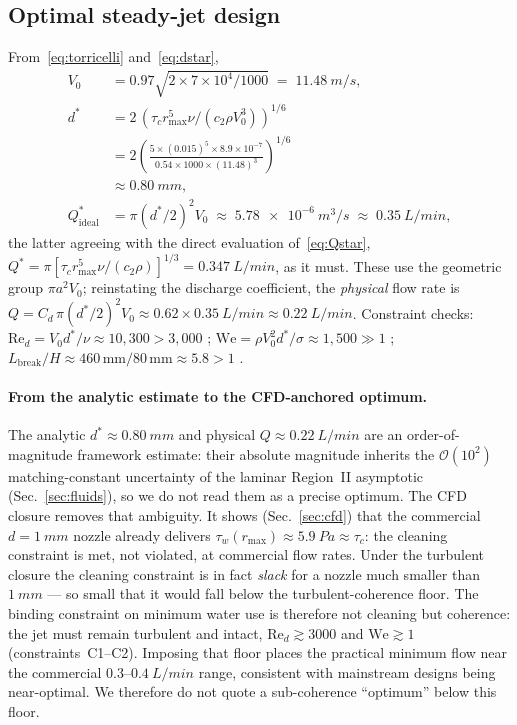 \documentclass[aps,prfluids,reprint,amsmath,amssymb,floatfix]{revtex4-2}
\newcommand{\Rey}{\mathrm{Re}}
\newcommand{\We}{\mathrm{We}}
\newcommand{\order}[1]{\mathcal{O}\!\left(#1\right)}
\begin{document}
\subsection{Optimal steady-jet design}

From~\eqref{eq:torricelli} and~\eqref{eq:dstar},
\begin{align}
  V_0 &= 0.97\sqrt{2 \times 7\times 10^4/1000} \;=\; \SI{11.48}{m/s},\\
  d^* &= 2\,(\tau_c r_\mathrm{max}^5 \nu/(c_2\rho V_0^3))^{1/6}\nonumber\\
      &= 2\left(\frac{5 \times (0.015)^5 \times 8.9\times 10^{-7}}
              {0.54 \times 1000 \times (11.48)^3}\right)^{1/6}\nonumber\\
      &\approx \SI{0.80}{mm},\\
  Q^*_\mathrm{ideal} &= \pi (d^*/2)^2 V_0
                     \;\approx\; \SI{5.78e-6}{m^3/s}
                     \;\approx\; \SI{0.35}{L/min},
\end{align}
the latter agreeing with the direct evaluation of~\eqref{eq:Qstar},
$Q^* = \pi[\tau_c r_\mathrm{max}^5\nu/(c_2\rho)]^{1/3}
 = \SI{0.347}{L/min}$, as it must. These use the geometric group
$\pi a^2 V_0$; reinstating the discharge coefficient, the \emph{physical}
flow rate is
$Q = C_d\,\pi(d^*/2)^2 V_0 \approx 0.62 \times \SI{0.35}{L/min}
 \approx \SI{0.22}{L/min}$.
Constraint checks: $\Rey_d = V_0 d^*/\nu \approx 10{,}300 > 3{,}000$
\checkmark; $\We = \rho V_0^2 d^*/\sigma \approx 1{,}500 \gg 1$ \checkmark;
$L_\mathrm{break}/H \approx 460\,\mathrm{mm}/80\,\mathrm{mm} \approx 5.8 > 1$
\checkmark.

\paragraph{From the analytic estimate to the CFD-anchored optimum.}
The analytic $d^* \approx \SI{0.80}{mm}$ and physical
$Q \approx \SI{0.22}{L/min}$ are an order-of-magnitude framework estimate:
their absolute magnitude inherits the $\order{10^2}$ matching-constant
uncertainty of the laminar Region~II asymptotic (Sec.~\ref{sec:fluids}), so
we do not read them as a precise optimum. The CFD closure removes that
ambiguity. It shows (Sec.~\ref{sec:cfd}) that the commercial
$d = \SI{1}{mm}$ nozzle already delivers
$\tau_w(r_\mathrm{max}) \approx \SI{5.9}{Pa} \approx \tau_c$: the cleaning
constraint is met, not violated, at commercial flow rates. Under the
turbulent closure the cleaning constraint is in fact \emph{slack} for a
nozzle much smaller than $\SI{1}{mm}$ --- so small that it would fall below
the turbulent-coherence floor. The binding constraint on minimum water use is
therefore not cleaning but coherence: the jet must remain turbulent and
intact, $\Rey_d \gtrsim 3000$ and $\We \gtrsim 1$ (constraints~C1--C2).
Imposing that floor places the practical minimum flow near the commercial
$0.3$--$\SI{0.4}{L/min}$ range, consistent with mainstream designs being
near-optimal. We therefore do not quote a sub-coherence ``optimum'' below
this floor.
\end{document}

